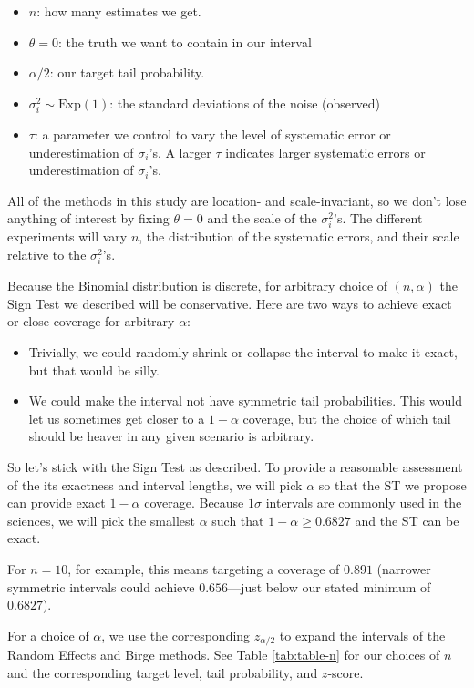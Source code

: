 \documentclass[12pt]{article}
\begin{document}
\begin{itemize}
\item
  $n$: how many estimates we get.
\item
  $\theta=0$: the truth we want to contain in our interval
\item
  $\alpha/2$: our target tail probability.
\item
  $\sigma_i^2\sim\mathrm{Exp}(1)$: the standard deviations of the
  noise (observed)
\item
  $\tau$: a parameter we control to vary the level of systematic error
  or underestimation of $\sigma_i$'s. A larger $\tau$ indicates larger
  systematic errors or underestimation of $\sigma_i$'s.
\end{itemize}

All of the methods in this study are location- and scale-invariant, so we don't lose anything of interest by fixing $\theta=0$ and the scale of the $\sigma_i^2$'s. The different experiments will vary $n$, the distribution of the systematic errors, and their scale relative to the $\sigma_i^2$'s.

Because the Binomial distribution is discrete, for arbitrary choice of $(n,\alpha)$ the Sign Test we described will be conservative. Here are two ways to achieve exact or close coverage for arbitrary $\alpha$:

\begin{itemize}
\item
  Trivially, we could randomly shrink or collapse the interval to make it exact, but that would be silly.
\item
  We could make the interval not have symmetric tail probabilities. This would let us sometimes get closer to a $1-\alpha$ coverage, but the choice of which tail should be heaver in any given scenario is arbitrary.
\end{itemize}

So let's stick with the Sign Test as described. To provide a reasonable assessment of the its exactness and interval lengths, we will pick $\alpha$ so that the ST we propose can provide exact $1-\alpha$ coverage. Because $1\sigma$ intervals are commonly used in the sciences, we will pick the smallest $\alpha$ such that $1-\alpha\geq 0.6827$ and the ST can be exact.

For $n=10$, for example, this means targeting a coverage of $0.891$ (narrower symmetric intervals could achieve $0.656$---just below our stated minimum of $0.6827$).

For a choice of $\alpha$, we use the corresponding $z_{\alpha/2}$ to expand the intervals of the Random Effects and Birge methods. See Table \ref{tab:table-n} for our choices of $n$ and the corresponding target level, tail probability, and $z$-score.
\end{document}
